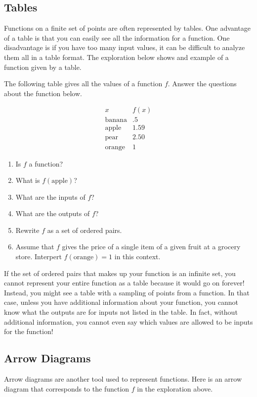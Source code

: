 \documentclass[noauthor, nooutcomes]{ximera}
\begin{document}
\subsection{Tables}
Functions on a finite set of points are often represented by tables.  One advantage of a table is that you can easily see all the information for a function.  One disadvantage is if you have too many input values, it can be difficult to analyze them all in a table format.  The exploration below shows and example of a function given by a table.

\begin{exploration}
The following table gives all the values of a function $f$.  Answer the questions about the function below.

$$
\begin{array}{cc}
x & f(x) \\
\hline
\text{banana}&.5\\
\text{apple}&1.59\\
\text{pear}&2.50\\
\text{orange}&1
\end{array}
$$

\begin{enumerate}[label=\alph*.]
\item Is $f$ a function? 
\item What is $f(\text{apple})$?
\item  What are the inputs of $f$?
\item  What are the outputs of $f$?
\item Rewrite $f$ as a set of ordered pairs.
\item  Assume that $f$ gives the price of a single item of a given fruit at a grocery store.  Interpert $f(\text{orange})=1$ in this context.
\end{enumerate}
\end{exploration}

If the set of ordered pairs that makes up your function is an infinite set, you cannot represent your entire function as a table because it would go on forever!  Instead, you might see a table with a sampling of points from a function. In that case, unless you have additional information about your function, you cannot know what the outputs are for inputs not listed in the table.  In fact, without additional information, you cannot even say which values are allowed to be inputs for the function!

\subsection{Arrow Diagrams}
Arrow diagrams are another tool used to represent functions.  Here is an arrow diagram that corresponds to the function $f$ in the exploration above.
\end{document}
